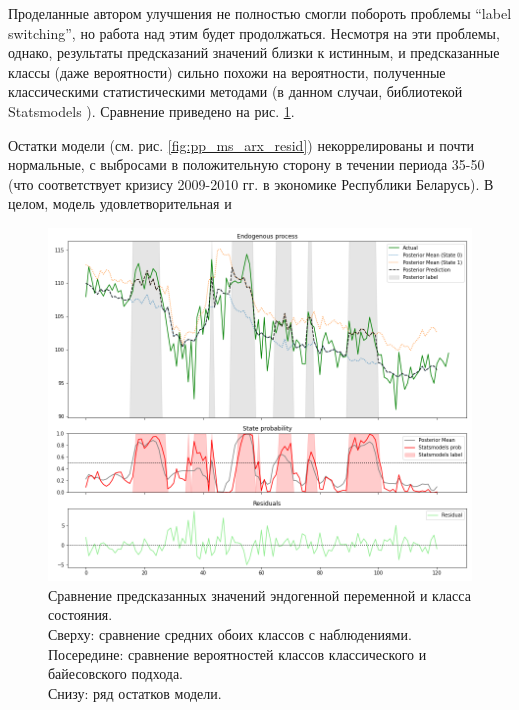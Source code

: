 \documentclass[a4paper,14pt]{extreport}
\begin{document}
Проделанные автором улучшения не полностью смогли побороть проблемы ``label switching'', но работа над этим будет продолжаться. Несмотря на эти проблемы, однако, результаты предсказаний значений близки к истинным, и предсказанные классы (даже вероятности) сильно похожи на вероятности, полученные классическими статистическими методами (в данном случаи, библиотекой Statsmodels \cite{statsmodels}). Сравнение приведено на рис. \ref{fig:pp_ms_arx_fit}.

Остатки модели (см. рис. \ref{fig:pp_ms_arx_resid}) некоррелированы и почти нормальные, с выбросами в положительную сторону в течении периода 35-50 (что соответствует кризису 2009-2010 гг. в экономике Республики Беларусь). В целом, модель удовлетворительная и 

\begin{figure}[H]
	\includegraphics[width=\linewidth]{img/gen/pp_ms_arx_fit.png}
	\caption{
		Сравнение предсказанных значений эндогенной переменной и класса состояния. \\
		Сверху: сравнение средних обоих классов с наблюдениями. \\
		Посередине: сравнение вероятностей классов классического и байесовского подхода. \\
		Снизу: ряд остатков модели.
	}
	\label{fig:pp_ms_arx_fit}
\end{figure}
\end{document}
